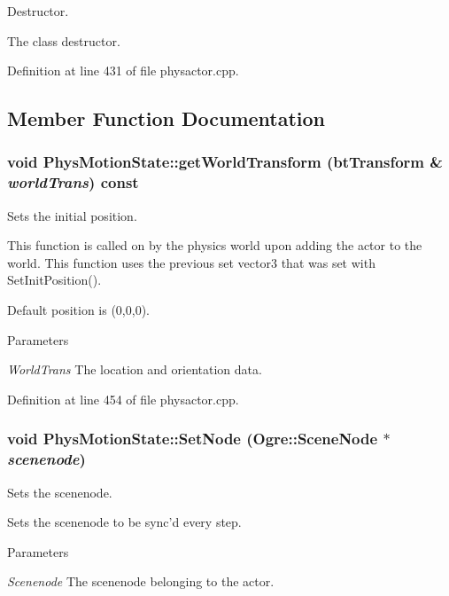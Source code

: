 Destructor. 

The class destructor. 

Definition at line 431 of file physactor.cpp.



\subsection{Member Function Documentation}
\hypertarget{classPhysMotionState_ad7f6fc932da90cc2a718fbe809d95287}{
\subsubsection[{getWorldTransform}]{\setlength{\rightskip}{0pt plus 5cm}void PhysMotionState::getWorldTransform (btTransform \& {\em worldTrans}) const}}
\label{d2/d14/classPhysMotionState_ad7f6fc932da90cc2a718fbe809d95287}


Sets the initial position. 

This function is called on by the physics world upon adding the actor to the world. This function uses the previous set vector3 that was set with SetInitPosition(). \par
 Default position is (0,0,0). 
\begin{DoxyParams}{Parameters}
\item[{\em WorldTrans}]The location and orientation data. \end{DoxyParams}


Definition at line 454 of file physactor.cpp.

\hypertarget{classPhysMotionState_a4ba21f0b58f33197b61cf1a9754027bc}{
\subsubsection[{SetNode}]{\setlength{\rightskip}{0pt plus 5cm}void PhysMotionState::SetNode (Ogre::SceneNode $\ast$ {\em scenenode})}}
\label{d2/d14/classPhysMotionState_a4ba21f0b58f33197b61cf1a9754027bc}


Sets the scenenode. 

Sets the scenenode to be sync'd every step. 
\begin{DoxyParams}{Parameters}
\item[{\em Scenenode}]The scenenode belonging to the actor. \end{DoxyParams}


